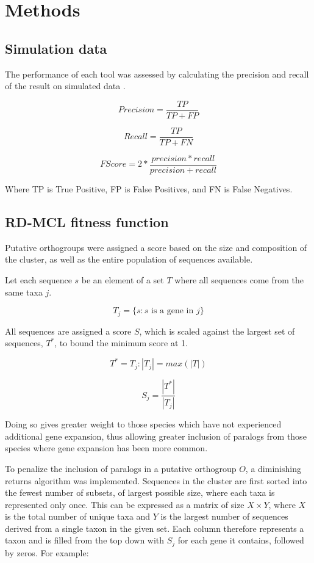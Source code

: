 \documentclass[twocolumn]{bmcart}%
\begin{document}
\section{Methods}
\subsection{Simulation data}
The performance of each tool was assessed by calculating the precision and recall of the result on simulated data \cite{Emms:2015ig}.

$$
Precision = \frac{TP}{TP + FP}
$$

$$
Recall = \frac{TP}{TP + FN}
$$

$$
F Score = 2 * \frac{precision * recall}{precision + recall}
$$

Where TP is True Positive, FP is False Positives, and FN is False Negatives.

\subsection{RD-MCL fitness function}
Putative orthogroups were assigned a score based on the size and composition of the cluster, as well as the entire population of sequences available.

Let each sequence $s$ be an element of a set $T$ where all sequences come from the same taxa $j$.

$$
T_j = \{s:s \text{ is a gene in } j\}
$$

All sequences are assigned a score $S$, which is scaled against the largest set of sequences, $T^*$, to bound the minimum score at 1.

$$
T^* = T_j:|T_j| = max(|T|)
$$

$$
S_j = \frac{|T^*|}{|T_j|}
$$

Doing so gives greater weight to those species which have not experienced additional gene expansion, thus allowing greater inclusion of paralogs from those species where gene expansion has been more common.

To penalize the inclusion of paralogs in a putative orthogroup $O$, a diminishing returns algorithm was implemented. Sequences in the cluster are first sorted into the fewest number of subsets, of largest possible size, where each taxa is represented only once. This can be expressed as a matrix of size $X \times Y$, where $X$ is the total number of unique taxa and $Y$ is the largest number of sequences derived from a single taxon in the given set. Each column therefore represents a taxon and is filled from the top down with $S_j$ for each gene it contains, followed by zeros. For example:
\end{document}

